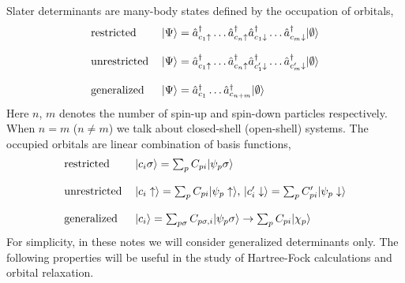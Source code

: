 \documentclass{article}
\newcommand{\CRE}[1]{\hat{a}^\dagger_{#1}}
\begin{document}
Slater determinants are many-body states defined by the occupation of orbitals,
\begin{equation}
\begin{tabular}{ll}
restricted     & $| \Psi \rangle = \CRE{c_1 \uparrow} \dots \CRE{c_{n} \uparrow} \CRE{c_1 \downarrow} \dots \CRE{c_{m} \downarrow} | \emptyset \rangle$ \\
\\
unrestricted & $| \Psi \rangle = \CRE{c_1 \uparrow} \dots \CRE{c_{n} \uparrow} \CRE{c^\prime_1 \downarrow} \dots \CRE{c^\prime_{m} \downarrow} | \emptyset \rangle$ \\
\\
generalized & $| \Psi \rangle = \CRE{c_1} \dots \CRE{c_{n+m}} | \emptyset \rangle$ \\
\end{tabular}
\end{equation}
Here $n$, $m$ denotes the number of spin-up and spin-down particles respectively. When $n=m$ ($n \neq m$) we talk about closed-shell (open-shell) systems.
The occupied orbitals are linear combination of basis functions,
\begin{equation}
\begin{tabular}{ll}
restricted     & $| c_i \sigma \rangle = \sum_p C_{pi} | \psi_p  \sigma \rangle$ \\
\\
unrestricted & $| c_i \uparrow \rangle = \sum_p C_{pi} | \psi_p \uparrow \rangle$, $| c^\prime_i \downarrow \rangle = \sum_p C^\prime_{pi} | \psi_p \downarrow \rangle$ \\
\\
generalized & $| c_i \rangle = \sum_{p \sigma} C_{p\sigma,i} | \psi_p \sigma \rangle \to \sum_p C_{pi} | \chi_p \rangle$ \\
\end{tabular}
\end{equation}
For simplicity, in these notes we will consider generalized determinants only. The following properties will be useful in the study of Hartree-Fock calculations and orbital relaxation.
\end{document}
